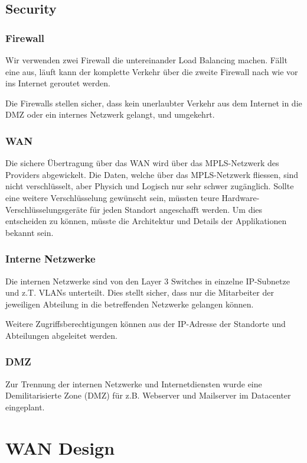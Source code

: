 \subsection{Security}

\subsubsection{Firewall}
Wir verwenden zwei Firewall die untereinander Load Balancing machen. Fällt eine aus, läuft kann der komplette Verkehr über die zweite Firewall nach wie vor ins Internet geroutet werden.

Die Firewalls stellen sicher, dass kein unerlaubter Verkehr aus dem Internet in die DMZ oder ein internes Netzwerk gelangt, und umgekehrt.

\subsubsection{WAN}
Die sichere Übertragung über das WAN wird über das MPLS-Netzwerk des Providers abgewickelt. Die Daten, welche über das MPLS-Netzwerk fliessen, sind nicht verschlüsselt, aber Physich und Logisch nur sehr schwer zugänglich. Sollte eine weitere Verschlüsselung gewünscht sein, müssten teure Hardware-Verschlüsselungsgeräte für jeden Standort angeschafft werden. Um dies entscheiden zu können, müsste die Architektur und Details der Applikationen bekannt sein.

\subsubsection{Interne Netzwerke}

Die internen Netzwerke sind von den Layer 3 Switches in einzelne IP-Subnetze und z.T. VLANs unterteilt. Dies stellt sicher, dass nur die Mitarbeiter der jeweiligen Abteilung in die betreffenden Netzwerke gelangen können.

Weitere Zugriffsberechtigungen können aus der IP-Adresse der Standorte und Abteilungen abgeleitet werden.

\subsubsection{DMZ}

Zur Trennung der internen Netzwerke und Internetdiensten wurde eine Demilitarisierte Zone (DMZ) für z.B. Webserver und Mailserver im Datacenter eingeplant.
 



\section{WAN Design}

